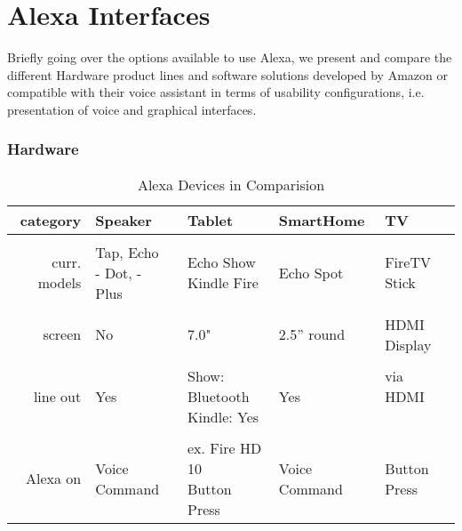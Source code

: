 \clearpage

\section{Alexa Interfaces}

Briefly going over the options available to use Alexa, we present and compare the different Hardware product lines and software solutions developed by Amazon or compatible with their voice assistant in terms of usability configurations, i.e. presentation of voice and graphical interfaces.

\subsubsection*{Hardware}
\begin{table}[htbp]
	\caption{Alexa Devices in Comparision}\label{alexaDeviceTable}
	\begin{tabularx}{\textwidth}{  r | l l l l  }
		
		category		& Speaker							& Tablet	& SmartHome	& TV	\\ \hline \hline \\
		curr. models	& \shortstack[l]{Tap, Echo \\ - Dot, - Plus}     & \shortstack[l]{Echo Show \\ Kindle Fire}    & Echo Spot & FireTV Stick \\ \hline \\
		screen  		& No      & 7.0" 		& 2.5'' round				&  HDMI Display      \\ \hline \\
		line out		& Yes      					        & \shortstack[l]{Show: Bluetooth \\ Kindle: Yes} & 	Yes & \shortstack{via HDMI \\ \textcolor{white}{text} }      \\ \hline \\
		Alexa on 	& Voice	Command					&
		\shortstack{ex. Fire HD 10\\Button Press}
		& Voice Command & %
		Button Press
	\end{tabularx}
\end{table}



